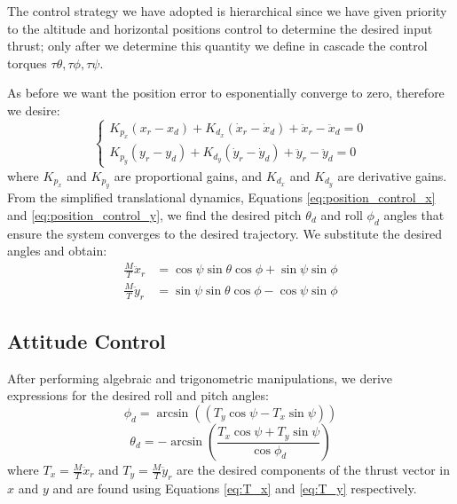 The control strategy we have adopted is hierarchical \cite{model_quadrotor}
since we have given priority to the 
altitude and horizontal positions control to determine the desired input thrust;
only after we determine this quantity
we define in cascade the control torques $\tau\theta, \tau\phi, \tau\psi$.

As before we want the position error to esponentially converge to zero,
therefore we desire:
\begin{equation}
    \begin{cases}
        K_{p_x} ( x_r - x_d )  + K_{d_x} (\dot{x}_r -\dot{x}_d) + \ddot{x}_r -\ddot{x}_d  = 0 \\[6pt]
        K_{p_y} (y_r - y_d )  + K_{d_y} ( \dot{y}_r - \dot{y}_d) +  \ddot{y}_r - \ddot{y}_d = 0
    \end{cases}
\end{equation}
where $K_{p_x}$ and $K_{p_y}$ are proportional gains, and $K_{d_x}$ and $K_{d_y}$ are derivative gains.
\noindent \\
From the simplified translational dynamics, Equations \ref{eq:position_control_x}
and \ref{eq:position_control_y}, we find the desired pitch \( \theta_d \) 
and roll \( \phi_d \) angles that ensure the system converges to the desired trajectory.
We substitute the desired angles and obtain:
\begin{subequations}
    \begin{align}
    \frac{M}{T} \ddot{x}_r &= \cos\psi \sin\theta \cos\phi + \sin\psi \sin\phi \label{eq:T_x} \\[6pt]
    \frac{M}{T} \ddot{y}_r &= \sin\psi \sin\theta \cos\phi - \cos\psi \sin\phi \label{eq:T_y}
    \end{align}
\end{subequations}
\subsection{Attitude Control}
\noindent
After performing algebraic and trigonometric manipulations, we derive expressions for the desired roll and pitch angles:
\begin{equation}
    \phi_d =  \arcsin\left(  (T_y \cos\psi - T_x \sin\psi) \right)
\end{equation}
\begin{equation}
    \theta_d = - \arcsin\left(\frac{T_x \cos\psi + T_y \sin\psi}{ \cos\phi_d } \right)
\end{equation}
where $T_x = \frac{M}{T} \ddot{x}_r$ and $T_y = \frac{M}{T} \ddot{y}_r$ are the
desired components of the thrust vector in $x$ and $y$ and are found
using Equations \ref{eq:T_x} and \ref{eq:T_y} respectively.

